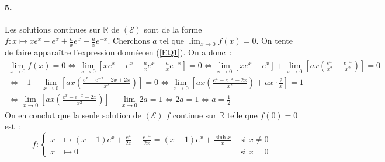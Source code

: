 \documentclass{article}
\begin{document}
    \paragraph{5.} Les solutions continues sur $\mathbb{R}$ de $(\mathscr{E})$ sont de la forme $f\colon x\mapsto xe^x-e^x+\frac{a}{x}e^x-\frac{a}{x}e^{-x}$. Cherchons $a$ tel que $\lim_{x\to 0}f(x)=0$. On tente de faire apparaître l'expression donnée en (\ref{EQ1}). On a donc~:
    \begin{align*}
      \lim_{x\to 0}f(x)=0 \iff \lim_{x\to 0}\left[xe^x-e^x+\frac{a}{x}e^x-\frac{a}{x}e^{-x}\right]=0 \iff \lim_{x\to 0}[xe^x-e^x] + \lim_{x\to 0}\left[ax\left(\frac{e^x}{x^2}-\frac{e^{-x}}{x^2}\right)\right]=0 \\
      \iff -1 + \lim_{x\to 0}\left[ax\left(\frac{e^x-e^{-x}-2x+2x}{x^2}\right)\right] = 0
      \iff \lim_{x\to 0}\left[ax\left(\frac{e^x-e^{-x}-2x}{x^2}\right)+ax\cdot\frac{2}{x}\right]=1 \\
      \iff \lim_{x\to 0}\left[ax\left(\frac{e^x-e^{-x}-2x}{x^2}\right)\right]+\lim_{x\to 0} 2a=1 \iff 2a = 1 \iff a=\frac{1}{2}
    \end{align*}
    On en conclut que la seule solution de $(\mathscr{E})$ $f$ continue sur $\mathbb{R}$ telle que $f(0)=0$ est~:
    \begin{displaymath}
      f\colon\left\{
      \begin{aligned}
          x&\longmapsto (x-1)e^x + \frac{e^x}{2x}-\frac{e^{-x}}{2x}=(x-1)e^x+\frac{\sinh x}{x} &\text{ si } x\neq 0\\
          x&\longmapsto 0 &\text{ si } x=0
      \end{aligned}
      \right.
    \end{displaymath}
\end{document}
